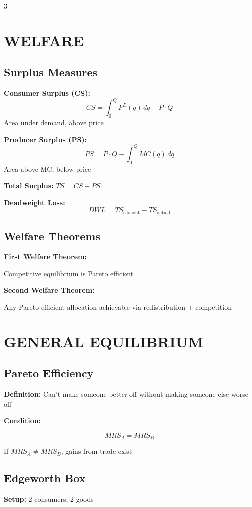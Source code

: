 \documentclass[8pt,landscape,letterpaper]{extarticle}
\begin{document}
\begin{multicols}{3}
\section*{WELFARE}

\subsection*{Surplus Measures}
\textbf{Consumer Surplus (CS):}
\[
CS = \int_0^Q P^D(q) \, dq - P \cdot Q
\]
Area under demand, above price

\textbf{Producer Surplus (PS):}
\[
PS = P \cdot Q - \int_0^Q MC(q) \, dq
\]
Area above MC, below price

\textbf{Total Surplus:} $TS = CS + PS$

\textbf{Deadweight Loss:}
\[
DWL = TS_{\text{efficient}} - TS_{\text{actual}}
\]

\subsection*{Welfare Theorems}
\begin{keybox}
\textbf{First Welfare Theorem:}

Competitive equilibrium is Pareto efficient

\textbf{Second Welfare Theorem:}

Any Pareto efficient allocation achievable via redistribution + competition
\end{keybox}

\section*{GENERAL EQUILIBRIUM}

\subsection*{Pareto Efficiency}
\textbf{Definition:} Can't make someone better off without making someone else worse off

\textbf{Condition:}
\begin{keybox}
\[
\boxed{MRS_A = MRS_B}
\]
\end{keybox}

If $MRS_A \neq MRS_B$, gains from trade exist

\subsection*{Edgeworth Box}
\textbf{Setup:} 2 consumers, 2 goods


\end{multicols}
\end{document}

